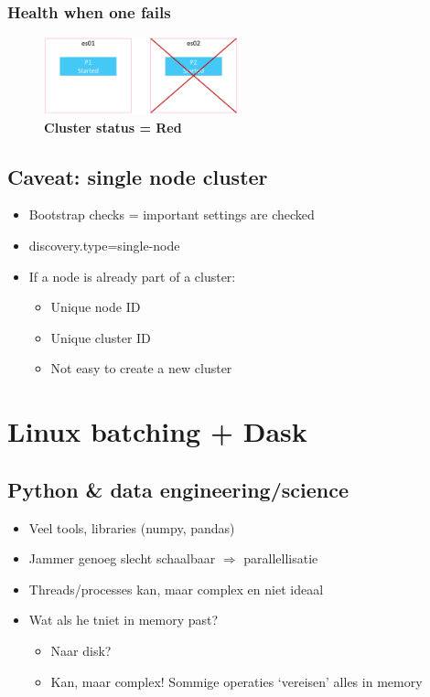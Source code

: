 \documentclass{article}
\begin{document}
\subsubsection{Health when one fails}

\begin{figure}[H]
    \centering
    \includegraphics[width=0.5\textwidth]{change-number-of-replicas-red.png}
    \caption{\textbf{Cluster status = Red}}
\end{figure}

\subsection{Caveat: single node cluster}

\begin{itemize}
    \item Bootstrap checks = important settings are checked
    \item discovery.type=single-node
    \item If a node is already part of a cluster:
    \begin{itemize}
        \item Unique node ID
        \item Unique cluster ID
        \item Not easy to create a new cluster
    \end{itemize}
\end{itemize}

\section{Linux batching + Dask}

\subsection{Python \& data engineering/science}

\begin{itemize}
    \item Veel tools, libraries (numpy, pandas)
    \item Jammer genoeg slecht schaalbaar $\Rightarrow$ parallellisatie
    \item Threads/processes kan, maar complex en niet ideaal
    \item Wat als he tniet in memory past?
    \begin{itemize}
        \item Naar disk?
        \item Kan, maar complex! Sommige operaties `vereisen' alles in memory
    \end{itemize}
\end{itemize}
\end{document}
